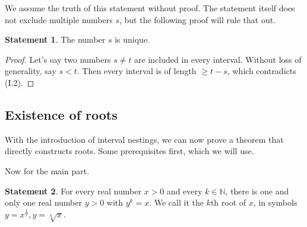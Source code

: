 \documentclass[a4paper, 10pt]{article}
\theoremstyle{definition}
\newtheorem*{statement}{Statement}
\theoremstyle{definition}
\begin{document}
    We assume the truth of this statement without proof. The statement itself does not exclude multiple numbers \(s\), but the following proof will rule that out.

    \begin{statement}
        The number \(s\) is unique.
    \end{statement}

    \begin{proof}
        Let's say two numbers \(s \neq t\) are included in every interval. Without loss of generality, say \(s < t\). Then every interval is of length \(\geq t - s\), which contradicts (I.2). \lightning
    \end{proof}

    \subsection{Existence of roots}

    With the introduction of interval nestings, we can now prove a theorem that directly constructs roots. Some prerequisites first, which we will use.

        

    Now for the main part.

    \begin{statement}
        For every real number \(x > 0\) and every \(k \in \mathbb{N}\), there is one and only one real number \(y > 0\) with \(y^k = x\). We call it the \(k\)th root of \(x\), in symbols \(y = x^\frac{1}{x}, y = \sqrt[k]{x}\).
    \end{statement}
\end{document}
